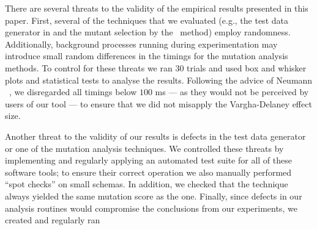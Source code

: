 

 There are several threats to the validity of the empirical results presented in this paper. First, several of the techniques that we evaluated (e.g., the test data generator in \SA and the mutant selection by the \tcm~method) employ randomness. Additionally, background processes running during experimentation may introduce small random differences in the timings for the mutation analysis methods. To control for these threats we ran 30 trials and used box and whisker plots and statistical tests to analyse the results. Following the advice of Neumann \etal~\cite{Neumann2015}, we disregarded all timings below $100$ ms --- as they would not be perceived by users of our tool --- to ensure that we did not misapply the Vargha-Delaney effect size.



Another threat to the validity of our results is defects in the test data generator or one of the mutation analysis
techniques. We controlled these threats by implementing and regularly applying an automated test suite for all of these
software tools; to ensure their correct operation we also manually performed ``spot checks'' on small schemas. In
addition, we checked that the \vma technique always yielded the same mutation score as the \Original one. Finally, since
defects in our analysis routines would compromise the conclusions from our experiments, we created and regularly ran 




